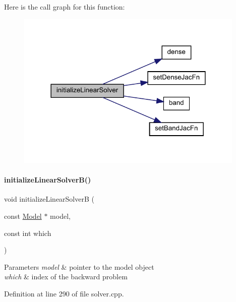 Here is the call graph for this function\+:
\nopagebreak
\begin{figure}[H]
\begin{center}
\leavevmode
\includegraphics[width=309pt]{classamici_1_1_solver_a6f41389f3a02d0b1ed9bfebcc080d3e1_cgraph}
\end{center}
\end{figure}
\mbox{\label{classamici_1_1_solver_a4f596731d15be6e9e76a2147aa1cce34}} 
\paragraph{\texorpdfstring{initializeLinearSolverB()}{initializeLinearSolverB()}}
{\footnotesize\ttfamily void initialize\+Linear\+SolverB (\begin{DoxyParamCaption}\item[{const \mbox{\hyperlink{classamici_1_1_model}{Model}} $\ast$}]{model,  }\item[{const int}]{which }\end{DoxyParamCaption})\hspace{0.3cm}{\ttfamily [protected]}}


\begin{DoxyParams}{Parameters}
{\em model} & pointer to the model object \\
\hline
{\em which} & index of the backward problem \\
\hline
\end{DoxyParams}


Definition at line 290 of file solver.\+cpp.

